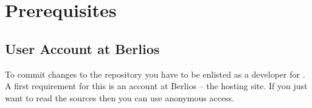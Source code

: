 \chapter{Prerequisites}


\section{User Account at Berlios}

To commit changes to the repository you have to be enlisted as a
developer for \ExTeX. A first requirement for this is an account at
Berlios -- the hosting site. If you just want to read the sources then
you can use anonymous access.

